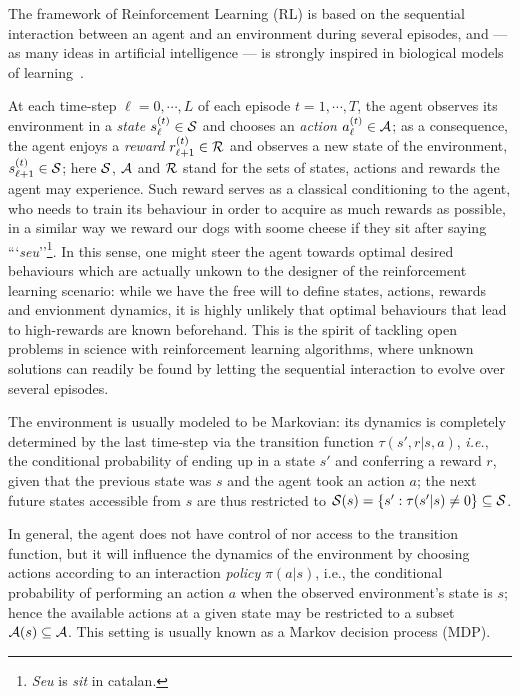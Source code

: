 The framework of Reinforcement Learning (RL) is based on the sequential interaction between an agent and an environment during several episodes, and --- as many ideas in artificial intelligence --- is strongly inspired in biological models of learning~\cite{Sutton2018,AlgorithmsRLCsaba}.

At each time-step $\ell=0,\cdots,L$ of each episode $t=1,\cdots,T$, the agent observes its environment in a \textit{state} $s_{\ell}^{(t)}\in\mathcal{S}$ and chooses an \textit{action} $a_\ell^{(t)}\in\mathcal{A}$; as a consequence, the agent enjoys a \textit{reward} $r_{\ell+1}^{(t)}\in\mathcal{R}$ and observes a new state of the environment, $s_{\ell+1}^{(t)}\in\mathcal{S}$; here $\mathcal{S}$, $\mathcal{A}$ and $\mathcal{R}$
stand for the sets of states, actions and rewards the agent may experience. Such reward serves as a classical conditioning to the agent, who needs to train its behaviour in order to acquire as much rewards as possible, in a similar way we reward our dogs with soome cheese if they sit after saying ```\textit{seu}''\footnote{\textit{Seu }is \textit{sit} in catalan.}. In this sense, one might steer the agent towards optimal desired behaviours which are actually unkown to the designer of the reinforcement learning scenario: while we have the free will to define states, actions, rewards and envionment dynamics, it is highly unlikely that optimal behaviours that lead to high-rewards are known beforehand. This is the spirit of tackling open problems in science with reinforcement learning algorithms, where unknown solutions can readily be found by letting the sequential interaction to evolve over several episodes.

The environment is usually modeled to be Markovian: its dynamics is completely determined by the last time-step via the transition function $\tau(s',r|s,a)$, \textit{i.e.}, the conditional probability of ending up in a state $s'$ and conferring a reward $r$, given that the previous state was $s$ and the agent took an action $a$; the next future states accessible from $s$ are thus restricted to $\mathcal{S}(s) = \{ s' : \tau(s'| s) \neq 0 \} \subseteq \mathcal{S}$.

In general, the agent does not have control of nor access to the transition function, but it will influence the dynamics of the environment by choosing actions according to an interaction \textit{policy} $\pi(a|s)$, i.e., the conditional probability of performing an action $a$ when the observed environment's state is $s$; hence the available actions at a given state may be restricted to a subset $\mathcal{A}(s) \subseteq \mathcal{A}$. This setting is usually known as a Markov decision process (MDP).

